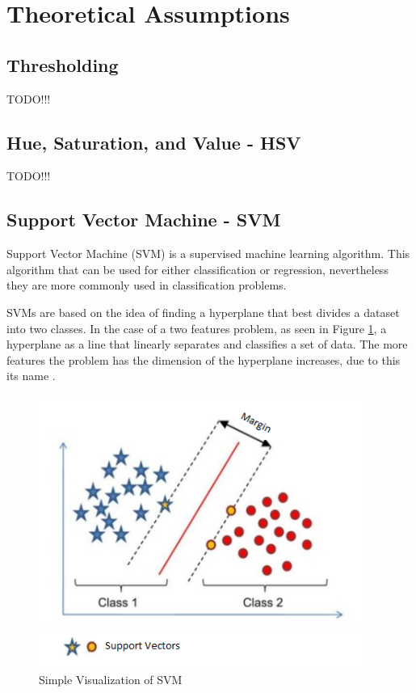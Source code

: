 \documentclass[a4paper,10pt,english]{article}
\begin{document}
    \section{Theoretical Assumptions}
    
        \subsection{Thresholding}
        TODO!!!
        
        \subsection{Hue, Saturation, and Value - HSV}
        
        TODO!!!
        
        \subsection{Support Vector Machine - SVM}
        
        Support Vector Machine (SVM) \cite{SVM:Cortes1995} is a supervised machine learning algorithm. This algorithm that can be used for either classification or regression, nevertheless they are more commonly used in classification problems.
        
        SVMs are based on the idea of finding a hyperplane that best divides a dataset into two classes. In the case of a two features problem, as seen in Figure \ref{fig:svm_simple}, a hyperplane as a line that linearly separates and classifies a set of data. The more features the problem has the dimension of the hyperplane increases, due to this its name \cite{SVM:Wiki}.
    
        \begin{figure}[h!]
            \centering
            \includegraphics[width=300pt]{images/svm_simple}
            \caption{Simple Visualization of SVM} \label{fig:svm_simple}
        \end{figure}
    
\end{document}
